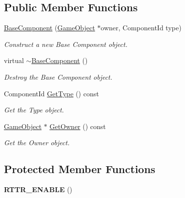 \subsection*{Public Member Functions}
\begin{DoxyCompactItemize}
\item 
\hyperlink{classBaseComponent_a64d22c1f5eb72a53ed7584e24f55fcfe}{Base\+Component} (\hyperlink{classGameObject}{Game\+Object} $\ast$owner, Component\+Id type)
\begin{DoxyCompactList}\small\item\em Construct a new Base Component object. \end{DoxyCompactList}\item 
\mbox{\label{classBaseComponent_ab281730e838c4cb33e96ab6d6b7fe15f}} 
virtual \hyperlink{classBaseComponent_ab281730e838c4cb33e96ab6d6b7fe15f}{$\sim$\+Base\+Component} ()
\begin{DoxyCompactList}\small\item\em Destroy the Base Component object. \end{DoxyCompactList}\item 
Component\+Id \hyperlink{classBaseComponent_a50e4481cdb27430cf4a5a10f1a06af35}{Get\+Type} () const
\begin{DoxyCompactList}\small\item\em Get the Type object. \end{DoxyCompactList}\item 
\hyperlink{classGameObject}{Game\+Object} $\ast$ \hyperlink{classBaseComponent_aa07f9b9c2ebdd2c314404771857e9e07}{Get\+Owner} () const
\begin{DoxyCompactList}\small\item\em Get the Owner object. \end{DoxyCompactList}\end{DoxyCompactItemize}
\subsection*{Protected Member Functions}
\begin{DoxyCompactItemize}
\item 
\mbox{\label{classBaseComponent_a3fe4f92f22cd488107f2929b7545d878}} 
{\bfseries R\+T\+T\+R\+\_\+\+E\+N\+A\+B\+LE} ()
\end{DoxyCompactItemize}
